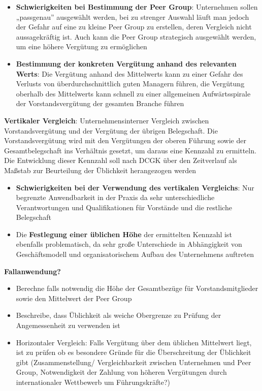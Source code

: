 \documentclass[
]{article}
\providecommand{\tightlist}{%
  \setlength{\itemsep}{0pt}\setlength{\parskip}{0pt}}
\begin{document}
\begin{itemize}
\item
  \textbf{Schwierigkeiten bei Bestimmung der Peer Group}: Unternehmen
  sollen „passgenau'' ausgewählt werden, bei zu strenger Auswahl läuft
  man jedoch der Gefahr auf eine zu kleine Peer Group zu erstellen,
  deren Vergleich nicht aussagekräftig ist. Auch kann die Peer Group
  strategisch ausgewählt werden, um eine höhere Vergütung zu ermöglichen
\item
  \textbf{Bestimmung der konkreten Vergütung anhand des relevanten
  Werts}: Die Vergütung anhand des Mittelwerts kann zu einer Gefahr des
  Verlusts von überdurchschnittlich guten Managern führen, die Vergütung
  oberhalb des Mittelwerts kann schnell zu einer allgemeinen
  Aufwärtsspirale der Vorstandsvergütung der gesamten Branche führen
\end{itemize}

\textbf{Vertikaler Vergleich}: Unternehmensinterner Vergleich zwischen
Vorstandsvergütung und der Vergütung der übrigen Belegschaft. Die
Vorstandsvergütung wird mit den Vergütungen der oberen Führung sowie der
Gesamtbelegschaft ins Verhältnis gesetzt, um daraus eine Kennzahl zu
ermitteln. Die Entwicklung dieser Kennzahl soll nach DCGK über den
Zeitverlauf als Maßstab zur Beurteilung der Üblichkeit herangezogen
werden

\begin{itemize}
\item
  \textbf{Schwierigkeiten bei der Verwendung des vertikalen Vergleichs}:
  Nur begrenzte Anwendbarkeit in der Praxis da sehr unterschiedliche
  Verantwortungen und Qualifikationen für Vorstände und die restliche
  Belegschaft
\item
  Die \textbf{Festlegung einer üblichen Höhe} der ermittelten Kennzahl
  ist ebenfalls problematisch, da sehr große Unterschiede in
  Abhängigkeit von Geschäftsmodell und organisatorischem Aufbau des
  Unternehmens auftreten
\end{itemize}

\textbf{Fallanwendung?}

\begin{itemize}
\tightlist
\item
  Berechne falls notwendig die Höhe der Gesamtbezüge für
  Vorstandsmitglieder sowie den Mittelwert der Peer Group
\item
  Beschreibe, dass Üblichkeit als weiche Obergrenze zu Prüfung der
  Angemessenheit zu verwenden ist
\item
  Horizontaler Vergleich: Falls Vergütung über dem üblichen Mittelwert
  liegt, ist zu prüfen ob es besondere Gründe für die Überschreitung der
  Üblichkeit gibt (Zusammenstellung/ Vergleichbarkeit zwischen
  Unternehmen und Peer Group, Notwendigkeit der Zahlung von höheren
  Vergütungen durch internationaler Wettbewerb um Führungskräfte?)
\end{itemize}
\end{document}
